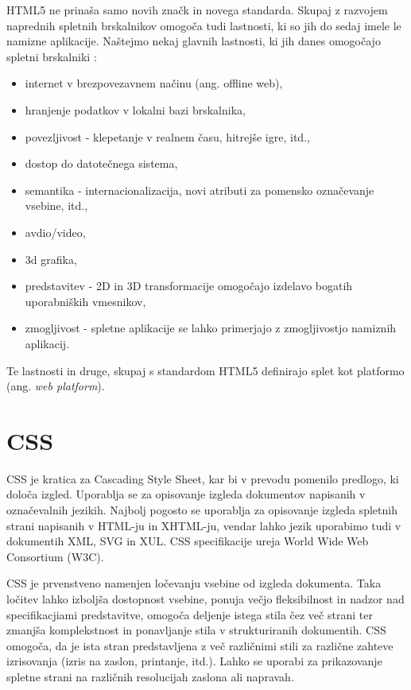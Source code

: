\documentclass[a4paper, 12pt]{book}
\begin{document}
HTML5 ne prina\v sa samo novih zna\v ck in novega standarda. Skupaj z razvojem naprednih spletnih brskalnikov omogo\v ca tudi lastnosti, ki so jih do sedaj imele le namizne aplikacije. Na\v stejmo nekaj glavnih lastnosti, ki jih danes omogo\v cajo spletni brskalniki
\cite{html5rocks}:

\begin{itemize}
\item internet v brezpovezavnem na\v cinu (ang. offline web),
\item hranjenje podatkov v lokalni bazi brskalnika,
\item povezljivost - klepetanje v realnem \v casu, hitrej\v se igre, itd.,
\item dostop do datote\v cnega sistema,
\item semantika - internacionalizacija, novi atributi za pomensko ozna\v cevanje vsebine, itd.,
\item avdio/video,
\item 3d grafika,
\item predstavitev - 2D in 3D transformacije omogo\v cajo izdelavo bogatih uporabni\v skih vmesnikov,
\item zmogljivost - spletne aplikacije se lahko primerjajo z zmogljivostjo namiznih aplikacij.
\end{itemize}

Te lastnosti in druge, skupaj s standardom HTML5 definirajo splet kot platformo (ang. \textit{web platform}).

\section{CSS}
CSS je kratica za Cascading Style Sheet, kar bi v prevodu pomenilo predlogo, ki dolo\v ca izgled. Uporablja se za opisovanje izgleda dokumentov napisanih v ozna\v cevalnih jezikih. Najbolj pogosto se uporablja za opisovanje izgleda spletnih strani napisanih v HTML-ju in XHTML-ju, vendar lahko jezik uporabimo tudi v dokumentih XML, SVG in XUL. CSS specifikacije ureja World Wide Web Consortium (W3C).

CSS je prvenstveno namenjen lo\v cevanju vsebine od izgleda dokumenta. Taka lo\v citev lahko izbolj\v sa dostopnost vsebine, ponuja ve\v cjo fleksibilnost in nadzor nad specifikacjiami predstavitve, omogo\v ca deljenje istega stila \v cez ve\v c strani ter zmanj\v sa komplekstnost in ponavljanje stila v strukturiranih dokumentih. CSS omogo\v ca, da je ista stran predstavljena z ve\v c razli\v cnimi stili za razli\v cne zahteve izrisovanja (izris na zaslon, printanje, itd.). Lahko se uporabi za prikazovanje spletne strani na razli\v cnih resolucijah zaslona ali napravah.
\end{document}
